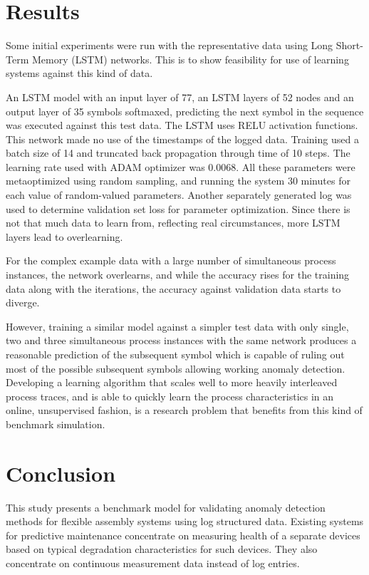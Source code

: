 \documentclass[journal]{IEEEtran}
\begin{document}
\section{Results}

Some initial experiments were run with the representative data using Long Short-Term Memory (LSTM) networks. This is to show feasibility for use of learning systems
against this kind of data.

An LSTM model with an input layer of 77, an LSTM layers of 52 nodes and an output layer of 35 symbols softmaxed,
predicting the next symbol in the sequence was executed against this test data. The LSTM uses RELU activation functions. This network made no use of the timestamps
of the logged data.
Training used a batch size of 14 and truncated back propagation through time of 10 steps. The learning rate used with ADAM optimizer was 0.0068. All these parameters
were metaoptimized using random sampling, and running the system 30 minutes for each value of random-valued parameters. Another separately generated log was used
to determine validation set loss for parameter optimization. Since there is not that much data to learn from, reflecting real circumstances, more LSTM layers lead to overlearning.

For the complex example data with a large number of simultaneous process instances, the network overlearns, and while the accuracy rises for the training data along with the iterations,
the accuracy against validation data starts to diverge.

However, training a similar model against a simpler test data with only single, two and three simultaneous process instances with the same network produces a reasonable
prediction of the subsequent symbol which is capable of ruling out most of the possible subsequent symbols allowing working anomaly detection.
Developing a learning algorithm that scales well to more heavily interleaved process traces, and is able to quickly learn the process characteristics in an online,
unsupervised fashion, is a research problem that benefits from this kind of benchmark simulation.

\section{Conclusion}

This study presents a benchmark model for validating anomaly detection methods for flexible assembly systems using log structured data.
Existing systems for predictive maintenance concentrate on measuring health of a separate devices based on typical degradation characteristics
for such devices. They also concentrate on continuous measurement data instead of log entries.
\end{document}

